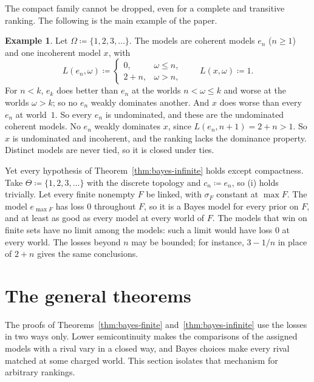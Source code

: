 \documentclass[11pt]{article}
\theoremstyle{definition}
\newtheorem{example}[theorem]{Example}
\theoremstyle{remark}
\begin{document}
The compact family cannot be dropped, even for a complete and transitive ranking. The following is the main example of the paper.

\begin{example}\label{ex:main}
Let $\Omega\coloneqq\{1,2,3,\dots\}$. The models are coherent models $e_n$ ($n\ge1$) and one incoherent model $x$, with
\[
L(e_n,\omega)\coloneqq\begin{cases}0,&\omega\le n,\\ 2+n,&\omega>n,\end{cases}\qquad L(x,\omega)\coloneqq1.
\]
For $n<k$, $e_k$ does better than $e_n$ at the worlds $n<\omega\le k$ and worse at the worlds $\omega>k$; so no $e_n$ weakly dominates another. And $x$ does worse than every $e_n$ at world~$1$. So every $e_n$ is undominated, and these are the undominated coherent models. No $e_n$ weakly dominates $x$, since $L(e_n,n+1)=2+n>1$. So $x$ is undominated and incoherent, and the ranking lacks the dominance property. Distinct models are never tied, so it is closed under ties.

Yet every hypothesis of Theorem~\ref{thm:bayes-infinite} holds except compactness. Take $\Theta\coloneqq\{1,2,3,\dots\}$ with the discrete topology and $c_n\coloneqq e_n$, so (i) holds trivially. Let every finite nonempty $F$ be linked, with $\sigma_F$ constant at $\max F$. The model $e_{\max F}$ has loss $0$ throughout $F$, so it is a Bayes model for every prior on $F$, and at least as good as every model at every world of $F$. The models that win on finite sets have no limit among the models: such a limit would have loss $0$ at every world. The losses beyond $n$ may be bounded; for instance, $3-1/n$ in place of $2+n$ gives the same conclusions.
\end{example}

\section{The general theorems}\label{sec:general}

The proofs of Theorems~\ref{thm:bayes-finite} and~\ref{thm:bayes-infinite} use the losses in two ways only. Lower semicontinuity makes the comparisons of the assigned models with a rival vary in a closed way, and Bayes choices make every rival matched at some charged world. This section isolates that mechanism for arbitrary rankings.
\end{document}
